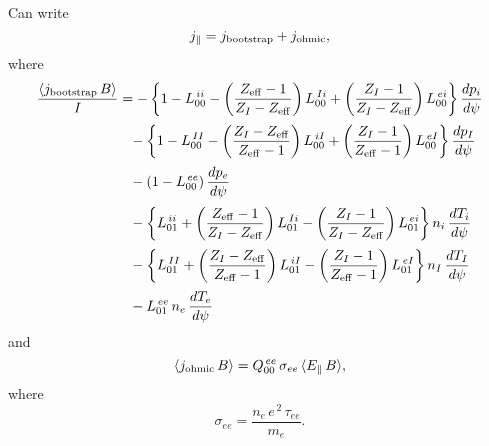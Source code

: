 \documentclass[12pt]{article}
\begin{document}
Can write
\begin{equation}
j_\parallel = j_{\rm bootstrap} + j_{\rm ohmic},
\end{equation}
where
\begin{align}
\frac{\langle j_{\rm bootstrap}\,B\rangle}{I}&= -\left\{1-L^{\,ii}_{00} - \left(\frac{Z_{\rm eff}-1}{Z_I-Z_{\rm eff}}\right)L^{\,Ii}_{00}
+ \left(\frac{Z_I-1}{Z_I-Z_{\rm eff}}\right)L^{\,ei}_{00}\right\}\frac{dp_i}{d\psi}\nonumber\\[0.5ex]
&\phantom{=}
- \left\{1-L^{\,II}_{00} - \left(\frac{Z_I-Z_{\rm eff}}{Z_{\rm eff}-1}\right)L^{\,iI}_{00}
+ \left(\frac{Z_I-1}{Z_{\rm eff}-1}\right)L^{\,eI}_{00}\right\}\frac{dp_I}{d\psi}
\nonumber\\[0.5ex]
&\phantom{=}-(1-L^{\,ee}_{00})\,\frac{dp_e}{d\psi}\nonumber\\[0.5ex]
&\phantom{=}- \left\{L^{\,ii}_{01} + \left(\frac{Z_{\rm eff}-1}{Z_I-Z_{\rm eff}}\right)L^{\,Ii}_{01}
- \left(\frac{Z_I-1}{Z_I-Z_{\rm eff}}\right)L^{\,ei}_{01}\right\}n_i\,\frac{dT_i}{d\psi}\nonumber\\[0.5ex]
&\phantom{=}
- \left\{L^{\,II}_{01} + \left(\frac{Z_I-Z_{\rm eff}}{Z_{\rm eff}-1}\right)L^{\,iI}_{01}
- \left(\frac{Z_I-1}{Z_{\rm eff}-1}\right)L^{\,eI}_{01}\right\}n_I\,\frac{dT_I}{d\psi}
\nonumber\\[0.5ex]
&\phantom{=}-L^{\,ee}_{01}\,n_e\,\frac{dT_e}{d\psi}
\end{align}
and
\begin{equation}
\langle j_{\rm ohmic}\,B\rangle = Q^{\,ee}_{00}\,\sigma_{ee}\,\langle E_\parallel\,B\rangle,
\end{equation}
where 
\begin{equation}
\sigma_{ee} = \frac{n_e\,e^{\,2}\,\tau_{ee}}{m_e}.
\end{equation}
\end{document}
